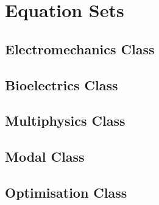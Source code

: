 \clearemptydoublepage
\chapter{Equation Sets}
\label{cha:equationsets}

\section{Electromechanics Class}

\clearpage

\clearpage


\section{Bioelectrics Class}
\clearpage

\clearpage

%

\section{Multiphysics Class}



\section{Modal Class}
\clearpage

\section{Optimisation Class}
\clearpage
